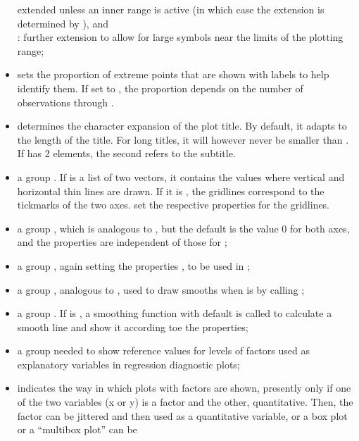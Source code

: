 \documentclass[11pt]{article}\usepackage[]{graphicx}\usepackage[]{color}
\begin{document}
\begin{itemize}
  extended unless an inner range is active (in which case the extension 
  is determined by ), and\\
  : further extension to allow for large symbols near the 
  limits of the plotting range;
\item
   sets the proportion of extreme points that are shown 
  with labels to help identify them.
  If set to , the proportion depends on the number  of
  observations through .
\item
   determines the character expansion of the plot title.
  By default, it adapts to the length of the title.
  For long titles, it will however never be smaller than
  . 
  If  has 2 elements, the second refers to the subtitle.
\item
  a group . If  is a list of two vectors,
  it contains the values where vertical and horizontal thin lines are drawn.
  If it is , the gridlines correspond to the tickmarks of the
  two axes.
   set the respective
  properties for the gridlines.
\item
  a group , which is analogous to , but the
  default is the value 0 for both axes, and the properties are independent
  of those for ;
\item
  a group , again setting the properties ,
  to be used in ;
\item
  a group , analogous to , used to draw smooths
  when  is  by calling ;
\item
  a group . If  is , a smoothing function 
  with default \Hneed{80mm}  
  is called to calculate a
  smooth line and show it according toe the  properties;
\item
  a group  needed to show reference values for levels of factors
  used as explanatory variables in regression diagnostic plots;
\item
   indicates the way in which plots with factors are shown,
  presently only if one of the two variables (x or y) is a factor and the
  other, quantitative. Then, the factor can be jittered and then used
  as a quantitative variable, or a box plot or a ``multibox plot'' can be 

\end{itemize}
\end{document}
